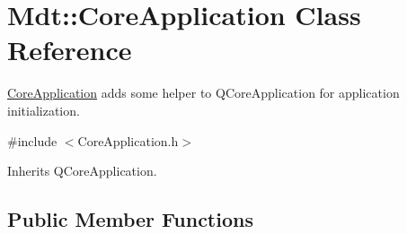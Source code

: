 \hypertarget{class_mdt_1_1_core_application}{}\section{Mdt\+:\+:Core\+Application Class Reference}
\label{class_mdt_1_1_core_application}


\hyperlink{class_mdt_1_1_core_application}{Core\+Application} adds some helper to Q\+Core\+Application for application initialization.  




{\ttfamily \#include $<$Core\+Application.\+h$>$}



Inherits Q\+Core\+Application.

\subsection*{Public Member Functions}
